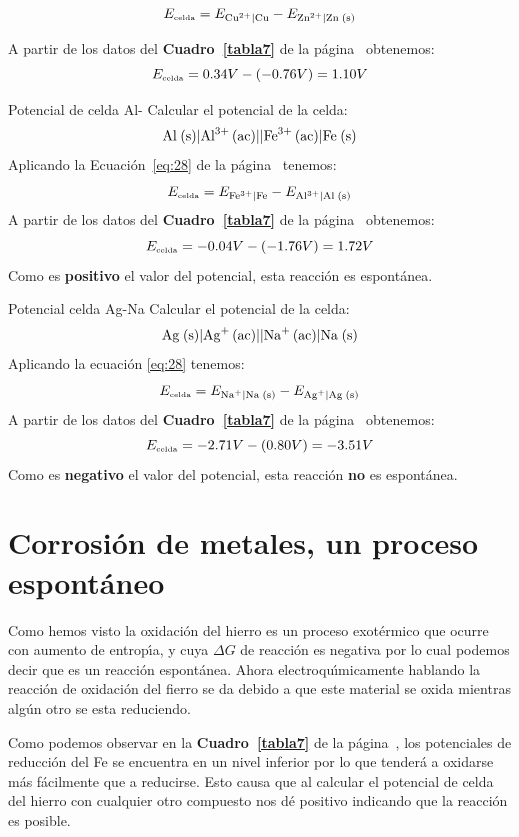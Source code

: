 $$E_{\textrm{\tiny celda}} = E_{\ce{Cu^2+}|\ce{Cu}}-E_{\ce{Zn^2+}|\ce{Zn (s)}}$$

A partir de los datos del \textbf{Cuadro~\ref{tabla7}} de la p\'agina~\pageref{tabla7} obtenemos:
$$E_{\textrm{\tiny celda}} = 0.34  V - (-0.76 V) =  1.10 V$$
\begin{ejemplo}{Potencial de celda Al-}
Calcular el potencial de la celda:
$$\ce{Al (s)}|\ce{Al^3+ (ac)}||\ce{Fe^3+ (ac)}| \ce{Fe (s)}$$
Aplicando la Ecuaci\'on~\ref{eq:28} de la p\'agina~\pageref{eq:28} tenemos:
$$E_{\textrm{\tiny celda}} = E_{\ce{Fe^3+}|\ce{Fe}}-E_{\ce{Al^3+}|\ce{Al (s)}}$$
A partir de los datos del \textbf{Cuadro~\ref{tabla7}} de la p\'agina~\pageref{tabla7} obtenemos:
$$E_{\textrm{\tiny celda}} = -0.04  V - (-1.76 V) =  1.72 V$$
Como es \textbf{positivo} el valor del potencial, esta reacci\'on es
espont\'anea.
\end{ejemplo}
\begin{ejemplo}{Potencial celda Ag-Na}
Calcular el potencial de la celda:
$$\ce{Ag (s)}| \ce{Ag+ (ac)}|| \ce{Na+ (ac)}| \ce{Na (s)}$$
Aplicando la ecuaci\'on \ref{eq:28} tenemos:
$$E_{\textrm{\tiny celda}} =E_{\ce{Na+}|\ce{Na (s)}}- E_{\ce{Ag+}|\ce{Ag (s)}}$$
A partir de los datos del \textbf{Cuadro~\ref{tabla7}} de la p\'agina~\pageref{tabla7} obtenemos:
$$E_{\textrm{\tiny celda}} = -2.71  V - (0.80 V) = -3.51 V$$
Como es \textbf{negativo} el valor del potencial, esta reacci\'on \textbf{no} es espont\'anea.
\end{ejemplo}


\section[Corrosi\'on de metales]{Corrosi\'on de metales, un proceso espont\'aneo}
Como hemos visto la oxidaci\'on del hierro es un proceso exot\'ermico que ocurre con aumento de entrop\'{\i}a, y cuya $\Delta G$ de reacci\'on es negativa por lo cual podemos decir que es un  reacci\'on espont\'anea. Ahora electroqu\'{\i}mica\-men\-te hablando la reacci\'on de oxidaci\'on del fierro se da debido a que este material se oxida mientras alg\'un otro se esta reduciendo. 

Como podemos observar en la \textbf{Cuadro~\ref{tabla7}} de la p\'agina~\pageref{tabla7}, los potenciales de reducci\'on del Fe se encuentra en un nivel inferior por lo que tender\'a a oxidarse m\'as f\'acilmente que a reducirse. Esto causa que al calcular el potencial de celda del hierro con cualquier otro compuesto nos d\'e positivo indicando que la reacci\'on es posible.

